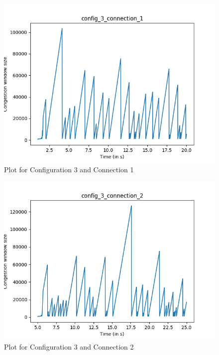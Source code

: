 \documentclass{article}
\begin{document}
\begin{figure}[H]
    \centering
    \includegraphics[scale = 0.8]{Q3/outputs/plots/config_3_connection_1.png}
    \caption{Plot for Configuration 3 and Connection 1}
\end{figure}


\begin{figure}[H]
    \centering
    \includegraphics[scale = 0.8]{Q3/outputs/plots/config_3_connection_2.png}
    \caption{Plot for Configuration 3 and Connection 2}
\end{figure}
\end{document}
